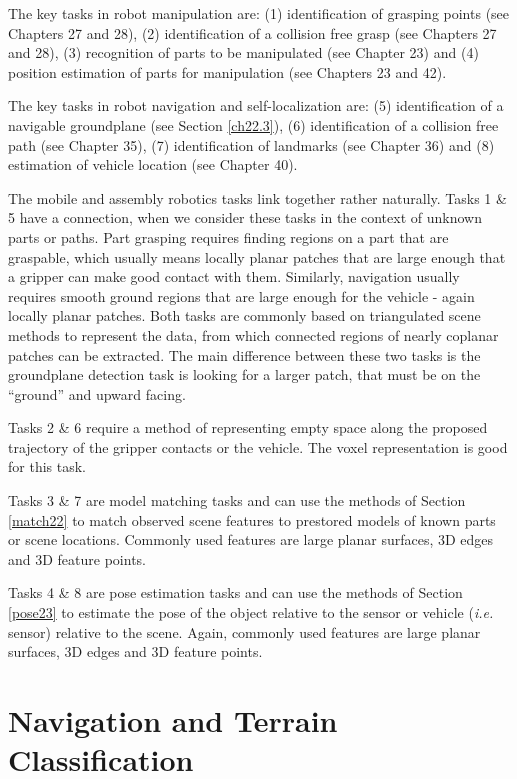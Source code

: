 \documentclass[twocolumn,oneside]{book}
\begin{document}
The key tasks in robot manipulation are:
(1) identification of grasping points (see Chapters 27 and 28),
(2) identification of a collision free grasp (see Chapters 27 and 28),
(3) recognition of parts to be manipulated (see Chapter 23) and
(4) position estimation of parts for manipulation (see Chapters 23 and 42).

The key tasks in robot navigation and self-localization are:
(5) identification of a navigable groundplane (see Section \ref{ch22.3}),
(6) identification of a collision free path (see Chapter 35),
(7) identification of landmarks (see Chapter 36) and
(8) estimation of vehicle location (see Chapter 40).

The mobile and assembly robotics tasks link together rather
naturally.
Tasks 1 \& 5 have a connection, when we consider these tasks
in the context of unknown parts or paths. Part grasping requires
finding regions on a part that are graspable, which usually means locally
planar patches that are large enough that a gripper can make good contact
with them.
Similarly, navigation usually requires smooth ground regions that are
large enough for the vehicle - again locally planar patches.
Both tasks are commonly based on triangulated scene methods to
represent the data, from which connected regions of nearly coplanar
patches can be extracted.
The main difference between these two tasks is the groundplane
detection task is looking for a larger patch, that must be on the
``ground'' and upward facing.

Tasks 2 \& 6 require a method of representing empty space along the 
proposed trajectory of the gripper contacts or the vehicle.
The voxel representation is good for this task.

Tasks 3 \& 7 are model matching tasks and can use the methods of
Section \ref{match22} to match observed scene features to prestored
models of known parts or scene locations.
Commonly used features are large planar surfaces, 3D edges and 3D feature
points.

Tasks 4 \& 8 are pose estimation tasks and can use the methods of
Section \ref{pose23} to estimate the pose of the object 
relative to the sensor or vehicle ({\it i.e.} sensor) relative to the scene.
Again, commonly used features are large planar surfaces, 3D edges and 3D feature
points.


\section{Navigation and Terrain Classification  \label{ch22.3}}
\end{document}
